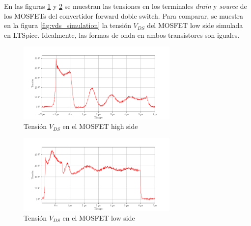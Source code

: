 


En las figuras \ref{fig:vds_high} y \ref{fig:vds_low} se muestran las tensiones en los terminales \textit{drain} y \textit{source} de los MOSFETs del convertidor forward doble switch.
Para comparar, se muestra en la figura \ref{fig:vds_simulation} la tensión $V_{DS}$ del MOSFET low side simulada en LTSpice. Idealmente, las formas de onda en ambos transistores son iguales.

\begin{figure}[H]
    \centering
    \includegraphics[width=0.7\textwidth]{images/capturas-osciloscopio/MOSFET/vds-high.png}
    \caption{Tensión $V_{DS}$ en el MOSFET high side}
    \label{fig:vds_high}
\end{figure}

\begin{figure}[H]
    \centering
    \includegraphics[width=0.7\textwidth]{images/capturas-osciloscopio/MOSFET/vds-low.png}
    \caption{Tensión $V_{DS}$ en el MOSFET low side}
    \label{fig:vds_low}
\end{figure}



